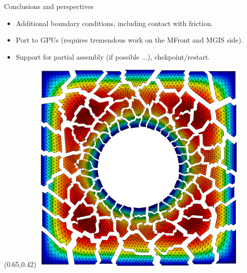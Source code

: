\documentclass{beamer}
\begin{document}
\begin{frame}{Conclusions and perspectives}
{\begin{minipage}{1.1\textwidth}
\begin{itemize}
\begin{itemize}
      structures in MGIS).
      \item Additional boundary conditions, including contact
      with friction.
      \item Port to GPUs (requires tremendous work on the
      MFront and MGIS side).
      \item Support for partial assembly (if possible ...),
      chekpoint/restart.
    \end{itemize}
  \end{itemize}
    \end{minipage}}
  \begin{textblock}{.2}(0.65,0.42)
  \includegraphics[width=.94\textwidth]{img/ex1p-np100.png}
  \end{textblock}
\end{frame}    
\end{document}
